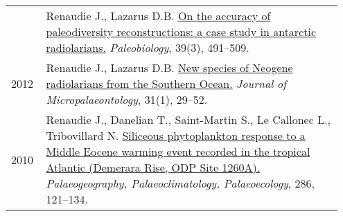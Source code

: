 \documentclass[11pt, a4paper]{article}
\begin{document}
\begin{longtable}{p{0.1\linewidth} P{0.85\linewidth}}
 & Renaudie J., Lazarus D.B. \href{http://dx.doi.org/10.1666/12016}{On the accuracy of paleodiversity reconstructions: a case study in antarctic radiolarians.} \textit{Paleobiology}, 39(3), 491--509.\\
2012 & Renaudie J., Lazarus D.B. \href{http://dx.doi.org/10.1144/0262-821X10-026}{New species of Neogene radiolarians from the Southern Ocean.} \textit{Journal of Micropalaeontology}, 31(1), 29--52.\\
2010 & Renaudie J., Danelian T., Saint-Martin S., Le Callonec L., Tribovillard N. \href{http://dx.doi.org/10.1016/j.palaeo.2009.12.004}{Siliceous phytoplankton response to a Middle Eocene warming event recorded in the tropical Atlantic (Demerara Rise, ODP Site 1260A).} \textit{Palaeogeography, Palaeoclimatology, Palaeoecology}, 286, 121--134.\\
\end{longtable}
\end{document}
